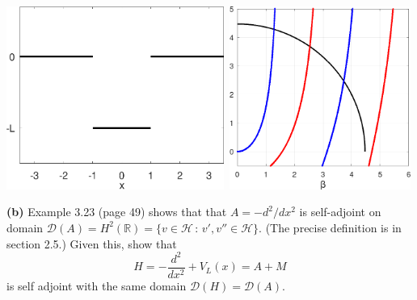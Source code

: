 \documentclass[12pt]{amsart}
\newcommand{\cD}{\mathcal{D}}
\newcommand{\cH}{\mathcal{H}}
\newcommand{\RR}{\mathbb{R}}
\newcommand{\epart}[1]{\medskip\noindent\textbf{(#1)}\quad }
\begin{document}
\bigskip
\begin{center}
\mbox{\includegraphics[height=60mm]{figs/squarepot.pdf} \hspace{10mm} \includegraphics[height=60mm]{figs/squareeigs.png}}
\end{center}

\medskip
\epart{b}  Example 3.23 (page 49) shows that that $A = -d^2/dx^2$ is self-adjoint on domain $\cD(A)=H^2(\RR)=\{v\in\cH\,:\,v',v''\in\cH\}$.  (The precise definition is in section 2.5.)  Given this, show that
	$$H=-\frac{d^2}{dx^2} + V_L(x) = A + M$$
is self adjoint with the same domain $\cD(H)=\cD(A)$.
\end{document}
